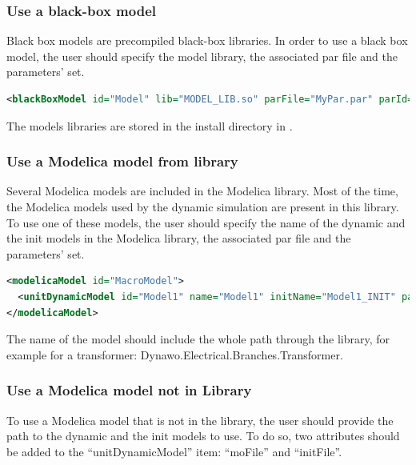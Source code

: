 \documentclass[a4paper, 12pt]{report}
\begin{document}
\subsubsection{Use a black-box model}

Black box models are precompiled black-box libraries. In order to use a black box model, the user should specify the model library, the associated par file and the parameters' set.
\begin{lstlisting}[language=XML, morekeywords={lib},numbers=none]
<blackBoxModel id="Model" lib="MODEL_LIB.so" parFile="MyPar.par" parId="5">
\end{lstlisting}

The models libraries are stored in the install directory in .

\subsubsection[Use a Modelica model from Dynawo library]{Use a Modelica model from \Dynawo library}

Several Modelica models are included in the \Dynawo Modelica library. Most of the time, the Modelica models used by the dynamic simulation are present in this library. To use one of these models, the user should specify the name of the dynamic and the init models in the Modelica library, the associated par file and the parameters' set.

\begin{lstlisting}[language=XML, morekeywords={name, initName}]
<modelicaModel id="MacroModel">
  <unitDynamicModel id="Model1" name="Model1" initName="Model1_INIT" parFile="MyPar.par" parId="2"/>
</modelicaModel>
\end{lstlisting}

The name of the model should include the whole path through the library, for example for a transformer: Dynawo.Electrical.Branches.Transformer.

\subsubsection[Use a Modelica model not in Dynawo Library]{Use a Modelica model not in \Dynawo Library}

To use a Modelica model that is not in the library, the user should provide the path to the dynamic and the init models to use. To do so, two attributes should be added to the ``unitDynamicModel'' item: ``moFile'' and ``initFile''.
\end{document}

